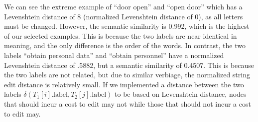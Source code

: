 We can see the extreme example of ``door open'' and ``open door'' which has a Levenshtein distance of 8 (normalized Levenshtein distance of 0), as all letters must be changed. However, the semantic similarity is 0.992, which is the highest of our selected examples. This is because the two labels are near identical in meaning, and the only difference is the order of the words. In contrast, the two labels ``obtain personal data'' and ``obtain personnel'' have a normalized Levenshtein distance of .5882, but a semantic similarity of 0.4507. This is because the two labels are not related, but due to similar verbiage, the normalized string edit distance is relatively small. If we implemented a distance between the two labels  $\delta\left(T_1[i].\text{label}, T_2[j].\text{label}\right)$ to be based on Levenshtein distance, nodes that should incur a cost to edit may not while those that should not incur a cost to edit may.

